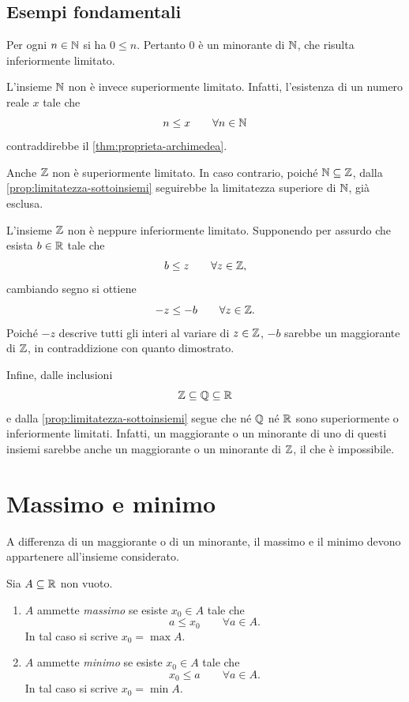 \subsection{Esempi fondamentali}
\label{subsec:lez04-esempi-limitatezza}

Per ogni \(n\in\mathbb{N}\) si ha \(0\le n\). Pertanto \(0\) è un
minorante di \(\mathbb{N}\), che risulta inferiormente limitato.

L'insieme \(\mathbb{N}\) non è invece superiormente limitato. Infatti,
l'esistenza di un numero reale \(x\) tale che
\[
  n\le x\qquad\forall n\in\mathbb{N}
\]
contraddirebbe il \cref{thm:proprieta-archimedea}.

Anche \(\mathbb{Z}\) non è superiormente limitato. In caso contrario,
poiché \(\mathbb{N}\subseteq\mathbb{Z}\), dalla
\cref{prop:limitatezza-sottoinsiemi} seguirebbe la limitatezza
superiore di \(\mathbb{N}\), già esclusa.

L'insieme \(\mathbb{Z}\) non è neppure inferiormente limitato. Supponendo
per assurdo che esista \(b\in\mathbb{R}\) tale che
\[
  b\le z\qquad\forall z\in\mathbb{Z},
\]
cambiando segno si ottiene
\[
  -z\le-b\qquad\forall z\in\mathbb{Z}.
\]
Poiché \(-z\) descrive tutti gli interi al variare di \(z\in\mathbb{Z}\),
\(-b\) sarebbe un maggiorante di \(\mathbb{Z}\), in contraddizione
con quanto dimostrato.

Infine, dalle inclusioni
\[
  \mathbb{Z}\subseteq\mathbb{Q}\subseteq\mathbb{R}
\]
e dalla \cref{prop:limitatezza-sottoinsiemi} segue che né \(\mathbb{Q}\)
né \(\mathbb{R}\) sono superiormente o inferiormente limitati. Infatti,
un maggiorante o un minorante di uno di questi insiemi sarebbe
anche un maggiorante o un minorante di \(\mathbb{Z}\), il che è impossibile.


\section{Massimo e minimo}
\label{sec:lez04-massimo-minimo}

A differenza di un maggiorante o di un minorante, il massimo
e il minimo devono appartenere all'insieme considerato.

\begin{definition}
\label{def:massimo-minimo}
Sia \(A\subseteq\mathbb{R}\) non vuoto.
\begin{enumerate}
  \item \(A\) ammette \emph{massimo} se esiste \(x_0\in A\) tale che
  \[
    a\le x_0\qquad\forall a\in A.
  \]
  In tal caso si scrive \(x_0=\max A\).

  \item \(A\) ammette \emph{minimo} se esiste \(x_0\in A\) tale che
  \[
    x_0\le a\qquad\forall a\in A.
  \]
  In tal caso si scrive \(x_0=\min A\).
\end{enumerate}
\end{definition}

